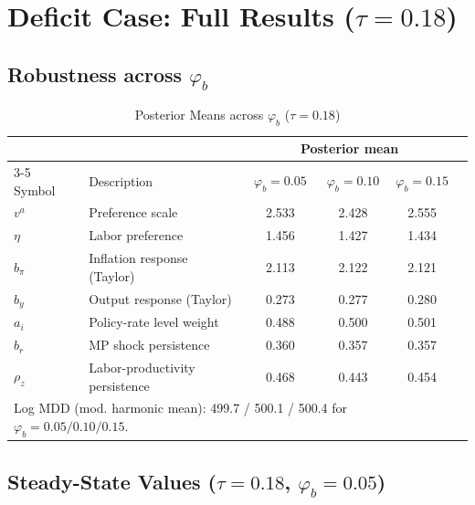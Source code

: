 \documentclass[]{article}
\begin{document}
\section{Deficit Case: Full Results ($\tau = 0.18$)}
\label{app:tau018}

\subsection{Robustness across $\varphi_b$}

\begin{table}[h]
\centering
\small
\begin{tabular}{llcccc}
\toprule
 & & \multicolumn{3}{c}{Posterior mean} \\
\cmidrule(lr){3-5}
Symbol & Description & $\varphi_b\!=\!0.05$ & $\varphi_b\!=\!0.10$ & $\varphi_b\!=\!0.15$ \\
\midrule
$v^a$    & Preference scale               & 2.533 & 2.428 & 2.555 \\
$\eta$   & Labor preference               & 1.456 & 1.427 & 1.434 \\
$b_\pi$  & Inflation response (Taylor)    & 2.113 & 2.122 & 2.121 \\
$b_y$    & Output response (Taylor)       & 0.273 & 0.277 & 0.280 \\
$a_i$    & Policy-rate level weight       & 0.488 & 0.500 & 0.501 \\
$b_r$    & MP shock persistence           & 0.360 & 0.357 & 0.357 \\
$\rho_z$ & Labor-productivity persistence & 0.468 & 0.443 & 0.454 \\
\bottomrule
\multicolumn{4}{l}{\parbox{0.82\linewidth}{\footnotesize Log MDD (mod. harmonic mean): 499.7 / 500.1 / 500.4 for $\varphi_b = 0.05 / 0.10 / 0.15$.}}
\end{tabular}
\caption{Posterior Means across $\varphi_b$ ($\tau = 0.18$)}
\label{tab:posteriors_all_018}
\end{table}

\clearpage
\subsection{Steady-State Values ($\tau = 0.18$, $\varphi_b = 0.05$)}
\end{document}
